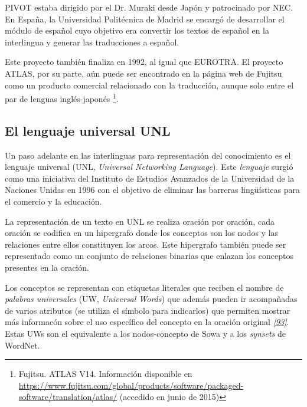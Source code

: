 \documentclass[a4paper,12pt,spanish]{book}
\begin{document}
PIVOT estaba dirigido por el Dr. Muraki desde Japón y patrocinado por NEC. En España, la
Universidad Politécnica de Madrid se encargó de desarrollar el módulo de español cuyo
objetivo era convertir los textos de español en la interlingua y generar las traducciones
a español.

Este proyecto también finaliza en 1992, al igual que EUROTRA. El proyecto ATLAS, por su
parte, aún puede ser encontrado en la página web de Fujitsu como un producto comercial
relacionado con la traducción, aunque solo entre el par de lenguas inglés-japonés \footnote{
Fujitsu. ATLAS V14. Información disponible en \href{https://www.fujitsu.com/global/products/software/packaged-software/translation/atlas/}{https://www.fujitsu.com/global/products/software/packaged-software/translation/atlas/} (accedido en junio de 2015)
}.


\subsection{El lenguaje universal UNL}
\label{1.state-of-the-art/i.representacion-conocimiento:el-lenguaje-universal-unl}
Un paso adelante en las interlinguas para representación del conocimiento es el lenguaje
universal (UNL, \emph{Universal Networking Language}). Este \emph{lenguaje} surgió como una
iniciativa del Instituto de Estudios Avanzados de la Universidad de la Naciones Unidas
en 1996 con el objetivo de eliminar las barreras lingüísticas para el comercio y la
educación.

La representación de un texto en UNL se realiza oración por oración, cada oración se
codifica en un hipergrafo donde los conceptos son los nodos y las relaciones entre ellos
constituyen los arcos. Este hipergrafo también puede ser representado como un conjunto
de relaciones binarias que enlazan los conceptos presentes en la oración.

Los conceptos se representan con etiquetas literales que reciben el nombre de
\emph{palabras universales} (UW, \emph{Universal Words}) que además pueden ir acompañadas de
varios atributos (se utiliza el símbolo  para indicarlos) que
permiten mostrar más informacón sobre el uso específico del concepto en la oración
original \label{1.state-of-the-art/i.representacion-conocimiento:id44}{\hyperref[zreferences:uchida1999]{\emph{{[}93{]}}}}. Estas UWs son el equivalente a los nodos-concepto de Sowa
y a los \emph{synsets} de WordNet.
\end{document}
